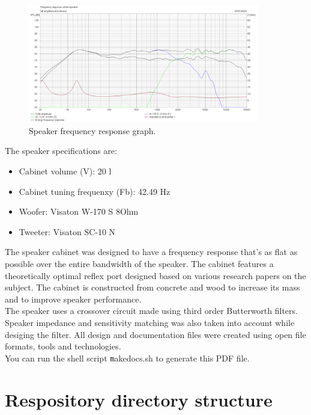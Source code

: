 \documentclass[10pt]{article}
\begin{document}
\begin{figure}[htp]
	\centering
	\includegraphics[width=0.9\textwidth]{../drawings/Frequency_Response.png}
	\caption{Speaker frequency response graph.}
\end{figure}

\pagebreak

\noindent The speaker specifications are:

\begin{itemize}
\item Cabinet volume (V): 20 l
\item Cabinet tuning frequenxy (Fb): 42.49 Hz
\item Woofer: Visaton W-170 S 8Ohm
\item Tweeter: Visaton SC-10 N
\end{itemize}

\noindent The speaker cabinet was designed to have a frequency response that's
as flat as possible over the entire bandwidth of the speaker. The cabinet
features a theoretically optimal reflex port designed based on various research
papers on the subject. The cabinet is constructed from concrete and wood to
increase its mass and to improve speaker performance.\\

\noindent The speaker uses a crossover circuit made using third order
Butterworth filters. Speaker impedance and sensitivity matching was also taken
into account while desiging the filter. All design and documentation files were
created using open file formats, tools and technologies.\\

\noindent You can run the shell script \texttt makedocs.sh to generate this
PDF file.

\section{Respository directory structure}
\end{document}

